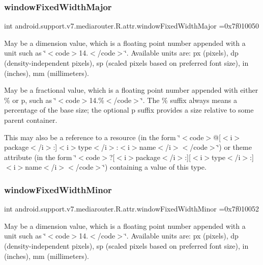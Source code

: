 \subsubsection{\texorpdfstring{window\+Fixed\+Width\+Major}{windowFixedWidthMajor}}
{\footnotesize\ttfamily int android.\+support.\+v7.\+mediarouter.\+R.\+attr.\+window\+Fixed\+Width\+Major =0x7f010050\hspace{0.3cm}{\ttfamily [static]}}

May be a dimension value, which is a floating point number appended with a unit such as \char`\"{}$<$code$>$14.\+5sp$<$/code$>$\char`\"{}. Available units are\+: px (pixels), dp (density-\/independent pixels), sp (scaled pixels based on preferred font size), in (inches), mm (millimeters). 

May be a fractional value, which is a floating point number appended with either \% or p, such as \char`\"{}$<$code$>$14.\%$<$/code$>$\char`\"{}. The \% suffix always means a percentage of the base size; the optional p suffix provides a size relative to some parent container. 

This may also be a reference to a resource (in the form \char`\"{}$<$code$>$@\mbox{[}$<$i$>$package$<$/i$>$\+:\mbox{]}$<$i$>$type$<$/i$>$\+:$<$i$>$name$<$/i$>$$<$/code$>$\char`\"{}) or theme attribute (in the form \char`\"{}$<$code$>$?\mbox{[}$<$i$>$package$<$/i$>$\+:\mbox{]}\mbox{[}$<$i$>$type$<$/i$>$\+:\mbox{]}$<$i$>$name$<$/i$>$$<$/code$>$\char`\"{}) containing a value of this type. \mbox{\label{classandroid_1_1support_1_1v7_1_1mediarouter_1_1R_1_1attr_ad959f251618f4e05f6853816fcab195d}} 
\subsubsection{\texorpdfstring{window\+Fixed\+Width\+Minor}{windowFixedWidthMinor}}
{\footnotesize\ttfamily int android.\+support.\+v7.\+mediarouter.\+R.\+attr.\+window\+Fixed\+Width\+Minor =0x7f010052\hspace{0.3cm}{\ttfamily [static]}}

May be a dimension value, which is a floating point number appended with a unit such as \char`\"{}$<$code$>$14.\+5sp$<$/code$>$\char`\"{}. Available units are\+: px (pixels), dp (density-\/independent pixels), sp (scaled pixels based on preferred font size), in (inches), mm (millimeters). 

